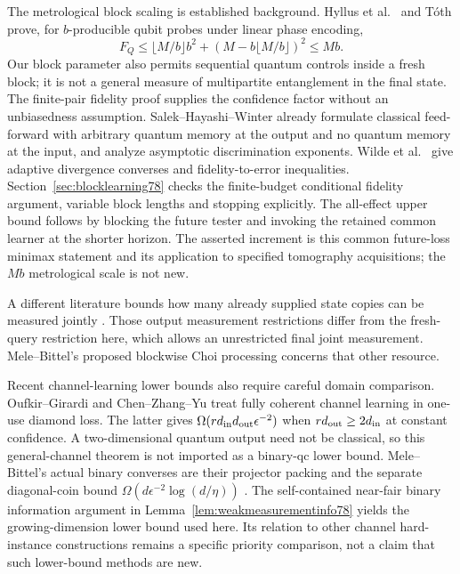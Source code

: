 The metrological block scaling is established background.
Hyllus et al.\ \cite[Observation~1, equation~(9)]{Hyllus78} and
T\'oth \cite[Observation~3, equation~(6)]{Toth78} prove, for
$b$-producible qubit probes under linear phase encoding,
\[
 F_Q\le \lfloor M/b\rfloor b^2+
              (M-b\lfloor M/b\rfloor)^2\le Mb.
\]
Our block parameter also permits sequential quantum controls inside
a fresh block; it is not a general measure of multipartite
entanglement in the final state. The finite-pair fidelity proof
supplies the confidence factor without an unbiasedness assumption.
Salek--Hayashi--Winter \cite[Section~II.2 and Section~V.2]{SHW68}
already formulate classical feed-forward with arbitrary quantum
memory at the output and no quantum memory at the input, and
analyze asymptotic discrimination exponents.
Wilde et al.\ \cite[Proposition~21 and Appendix~B]{WBHK72} give
adaptive divergence converses and fidelity-to-error inequalities.
Section~\ref{sec:blocklearning78} checks the finite-budget
conditional fidelity argument, variable block lengths and stopping
explicitly. The all-effect upper bound follows by blocking the
future tester and invoking the retained common learner at the
shorter horizon. The asserted increment is this common
future-loss minimax statement and its application to specified
tomography acquisitions; the $Mb$ metrological scale is not new.

A different literature bounds how many already supplied state
copies can be measured jointly \cite{CLL78,NZ78}. Those output
measurement restrictions differ from the fresh-query restriction
here, which allows an unrestricted final joint measurement.
Mele--Bittel's proposed blockwise Choi processing
\cite[Section~I.5]{MB67} concerns that other resource.

Recent channel-learning lower bounds also require careful domain
comparison. Oufkir--Girardi \cite{OG67} and Chen--Zhang--Yu
\cite[Theorems~1.1 and~4.2]{CZY78} treat fully coherent channel
learning in one-use diamond loss. The latter gives
$\Omega(rd_{\rm in}d_{\rm out}\epsilon^{-2})$ when
$rd_{\rm out}\ge2d_{\rm in}$ at constant confidence.
A two-dimensional quantum output need not be classical, so this
general-channel theorem is not imported as a binary-qc lower bound.
Mele--Bittel's actual binary converses are their projector packing
\cite[Proposition~IV.17]{MB67} and the separate diagonal-coin bound
$\Omega(d\epsilon^{-2}\log(d/\eta))$
\cite[Corollary~IV.20]{MB67}. The self-contained near-fair binary
information argument in Lemma~\ref{lem:weakmeasurementinfo78}
yields the growing-dimension lower bound used here. Its relation
to other channel hard-instance constructions remains a specific
priority comparison, not a claim that such lower-bound methods
are new.


